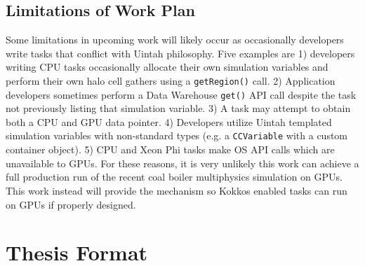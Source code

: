 \documentclass[12pt]{article}
\begin{document}
\subsection{Limitations of Work Plan}
\label{ch:workplan-limitations}
Some limitations in upcoming work will likely occur as occasionally developers write tasks that conflict with Uintah philosophy.  Five examples are 1) developers writing CPU tasks occasionally allocate their own simulation variables and perform their own halo cell gathers using a \texttt{getRegion()} call. 2) Application developers sometimes perform a Data Warehouse \texttt{get()} API call despite the task not previously listing that simulation variable. 3) A task may attempt to obtain both a CPU and GPU data pointer.  4) Developers utilize Uintah templated simulation variables with non-standard types (e.g. a \texttt{CCVariable} with a custom container object).  5) CPU and Xeon Phi tasks make OS API calls which are unavailable to GPUs.  For these reasons, it is very unlikely this work can achieve a full production run of the recent coal boiler multiphysics simulation on GPUs.  This work instead will provide the mechanism so Kokkos enabled tasks can run on GPUs if properly designed.  


\section{Thesis Format}
\label{ch:thesis_format}
\end{document}
